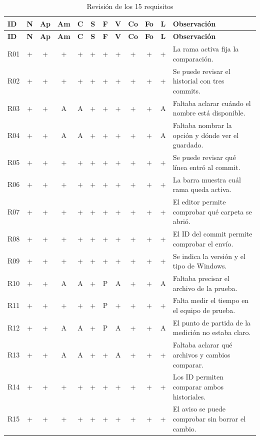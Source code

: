 \documentclass[11pt,a4paper]{article}
\begin{document}
\begingroup
\small
\setlength{\tabcolsep}{3pt}
\setlength{\LTpre}{4pt}
\setlength{\LTpost}{4pt}
\begin{longtable}{@{}l*{10}{c}>{\raggedright\arraybackslash}p{7.5cm}@{}}
\caption{Revisión de los 15 requisitos}\label{tab:revision}\\
\hline
\textbf{ID} & \textbf{N} & \textbf{Ap} & \textbf{Am} & \textbf{C} &
\textbf{S} & \textbf{F} & \textbf{V} & \textbf{Co} & \textbf{Fo} &
\textbf{L} & \textbf{Observación}\\
\hline
\endfirsthead
\hline
\textbf{ID} & \textbf{N} & \textbf{Ap} & \textbf{Am} & \textbf{C} &
\textbf{S} & \textbf{F} & \textbf{V} & \textbf{Co} & \textbf{Fo} &
\textbf{L} & \textbf{Observación}\\
\hline
\endhead
R01 & + & + & + & + & + & + & + & + & + & + & La rama activa fija la comparación.\\
R02 & + & + & + & + & + & + & + & + & + & + & Se puede revisar el historial con tres commits.\\
R03 & + & + & A & A & + & + & + & + & + & A & Faltaba aclarar cuándo el nombre está disponible.\\
R04 & + & + & A & A & + & + & + & + & + & A & Faltaba nombrar la opción y dónde ver el guardado.\\
R05 & + & + & + & + & + & + & + & + & + & + & Se puede revisar qué línea entró al commit.\\
R06 & + & + & + & + & + & + & + & + & + & + & La barra muestra cuál rama queda activa.\\
R07 & + & + & + & + & + & + & + & + & + & + & El editor permite comprobar qué carpeta se abrió.\\
R08 & + & + & + & + & + & + & + & + & + & + & El ID del commit permite comprobar el envío.\\
R09 & + & + & + & + & + & + & + & + & + & + & Se indica la versión y el tipo de Windows.\\
R10 & + & + & A & A & + & P & A & + & + & A & Faltaba precisar el archivo de la prueba.\\
R11 & + & + & + & + & + & P & + & + & + & + & Falta medir el tiempo en el equipo de prueba.\\
R12 & + & + & A & A & + & P & A & + & + & A & El punto de partida de la medición no estaba claro.\\
R13 & + & + & A & A & + & + & A & + & + & + & Faltaba aclarar qué archivos y cambios comparar.\\
R14 & + & + & + & + & + & + & + & + & + & + & Los ID permiten comparar ambos historiales.\\
R15 & + & + & + & + & + & + & + & + & + & + & El aviso se puede comprobar sin borrar el cambio.\\
\hline
\end{longtable}
\endgroup
\end{document}
